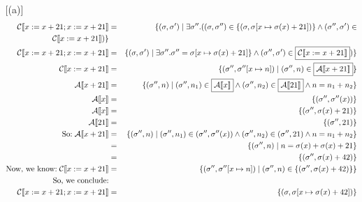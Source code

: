 \documentclass[10pt, oneside]{article}
\begin{document}
\begin{enumerate}[1.]
\begin{enumerate} [(a)]
    \begin{eqnarray*}   \mathcal{C} \llbracket x := x + 21; x := x + 21 \rrbracket & = & \{ (\sigma, \sigma') \mid \exists \sigma''.  ((\sigma, \sigma'') \in  \{ (\sigma, \sigma[x \mapsto \sigma(x) + 21]) \} \wedge (\sigma'', \sigma') \in \\ \mathcal{C} \llbracket x := x + 21\rrbracket )\}\\
      \mathcal{C} \llbracket x := x + 21; x := x + 21 \rrbracket & = & \{ (\sigma, \sigma') \mid \exists \sigma''.  \sigma'' = \sigma[x \mapsto \sigma(x) + 21] \} \wedge (\sigma'', \sigma') \in \boxed{\mathcal{C} \llbracket x := x + 21\rrbracket} )\}\\
       \mathcal{C} \llbracket x := x + 21\rrbracket & = & \{ (\sigma'', \sigma''[x \mapsto n]) \mid (\sigma'', n) \in \boxed{\mathcal{A} \llbracket x + 21 \rrbracket} \} \\
     \mathcal{A} \llbracket x + 21\rrbracket & = & \{ (\sigma'', n) \mid (\sigma'', n_1) \in \boxed{\mathcal{A} \llbracket x \rrbracket }\wedge (\sigma'', n_2) \in \boxed{\mathcal{A} \llbracket 21 \rrbracket }\wedge n = n_1 + n _2\} \\
       \mathcal{A} \llbracket x \rrbracket  & = & \{ (\sigma'', \sigma''(x)) \} \\
         \mathcal{A} \llbracket x \rrbracket  & = & \{ (\sigma'', \sigma(x) + 21) \} \\
    \mathcal{A} \llbracket 21 \rrbracket  & = & \{ (\sigma'', 21) \} \\
     \text{So:} \hspace{1mm}  \mathcal{A} \llbracket x + 21 \rrbracket & = & \{ (\sigma'', n) \mid (\sigma'', n_1) \in (\sigma'', \sigma''(x)) \wedge (\sigma'', n_2) \in (\sigma'', 21) \wedge n = n_1 + n_2 \} \\
    & = & \{ (\sigma'', n) \mid n = \sigma(x) + \sigma(x) + 21 \} \\
    & = & \{ (\sigma'', \sigma(x) + 42) \} \\
       \text{Now, we know:} \hspace{1mm}  \mathcal{C} \llbracket x := x + 21\rrbracket & = & \{ (\sigma'', \sigma''[x \mapsto n]) \mid (\sigma'', n) \in \{ (\sigma'', \sigma(x) + 42) \} \} \\
     \text{So, we conclude:}\\ \mathcal{C} \llbracket x := x + 21; x := x + 21 \rrbracket & = & \{(\sigma, \sigma[x \mapsto \sigma(x) + 42 ]) \}
    \end{eqnarray*}


\end{enumerate}
\end{enumerate}
\end{document}
